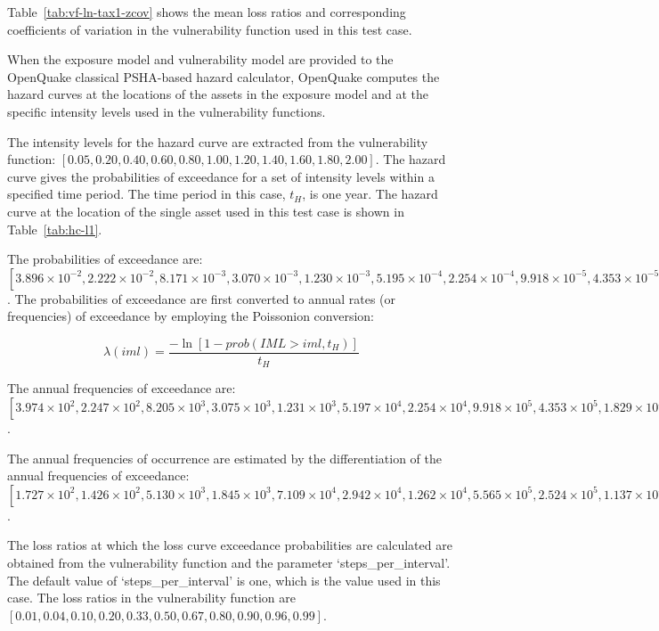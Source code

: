 Table~\ref{tab:vf-ln-tax1-zcov} shows the mean loss ratios and corresponding coefficients of variation in the vulnerability function used in this test case.

When the exposure model and vulnerability model are provided to the OpenQuake classical PSHA-based hazard calculator, OpenQuake computes the hazard curves at the locations of the assets in the exposure model and at the specific intensity levels used in the vulnerability functions.



The intensity levels for the hazard curve are extracted from the vulnerability function: $[0.05, 0.20, 0.40, 0.60, 0.80, 1.00, 1.20, 1.40, 1.60, 1.80, 2.00]$. The hazard curve gives the probabilities of exceedance for a set of intensity levels within a specified time period. The time period in this case, $t_H$, is one year. The hazard curve at the location of the single asset used in this test case is shown in Table~\ref{tab:hc-l1}.

The probabilities of exceedance are: $[3.896\times10^{-2}, 2.222\times10^{-2}, 8.171\times10^{-3}, 3.070\times10^{-3}, 1.230\times10^{-3}, 5.195\times10^{-4}, 2.254\times10^{-4}, 9.918\times10^{-5}, 4.353\times10^{-5}, 1.830\times10^{-5}, 6.925\times10^{-6}]$. The probabilities of exceedance are first converted to annual rates (or frequencies) of exceedance by employing the Poissonion conversion:

\begin{equation}
	\lambda(iml) = \frac{-\ln [1 - prob(IML > iml, t_H)]}{t_H}
\end{equation}

The annual frequencies of exceedance are: $[3.974\times10^{2}, 2.247\times10^{2}, 8.205\times10^{3}, 3.075\times10^{3}, 1.231\times10^{3}, 5.197\times10^{4}, 2.254\times10^{4}, 9.918\times10^{5}, 4.353\times10^{5}, 1.829\times10^{5}, 6.925\times10^{6}]$.

The annual frequencies of occurrence are estimated by the differentiation of the annual frequencies of exceedance: $[1.727\times10^{2}, 1.426\times10^{2}, 5.130\times10^{3}, 1.845\times10^{3}, 7.109\times10^{4}, 2.942\times10^{4}, 1.262\times10^{4}, 5.565\times10^{5}, 2.524\times10^{5}, 1.137\times10^{5}]$.

The loss ratios at which the loss curve exceedance probabilities are calculated are obtained from the vulnerability function and the parameter `steps\_per\_interval'. The default value of `steps\_per\_interval' is one, which is the value used in this case. The loss ratios in the vulnerability function are $[0.01, 0.04, 0.10, 0.20, 0.33, 0.50, 0.67, 0.80, 0.90, 0.96, 0.99]$.

